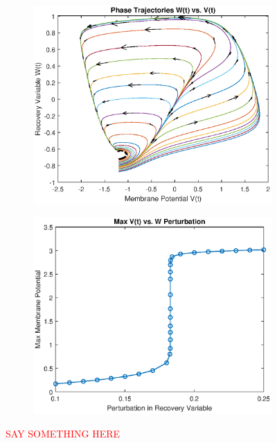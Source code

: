 \documentclass{book}
\theoremstyle{definition}
\begin{document}
\begin{figure}[!htb]
	\centering
	\begin{subfigure}{0.5\textwidth}
		\centering
		\includegraphics[scale=0.6]{FHN_lab/V_W_5.eps}
	\end{subfigure}%
	\begin{subfigure}{0.5\textwidth}
		\centering
		\includegraphics[scale=0.6]{FHN_lab/thres_5.eps}
		
	\end{subfigure}%
	\caption{\textcolor{red}{SAY SOMETHING HERE}}
	\label{Fig:8}
\end{figure}
\end{document}
